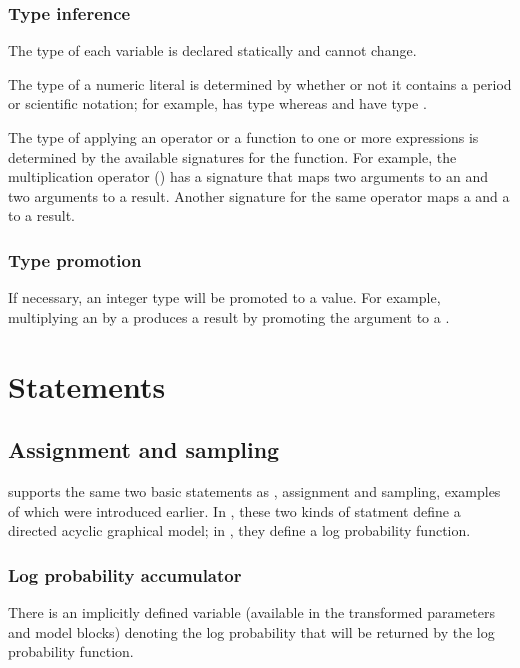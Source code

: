 \documentclass[article]{jss}
\begin{document}
\subsubsection{Type inference}

The type of each variable is declared statically and cannot change.  

The type of a numeric literal is determined by whether or not it
contains a period or scientific notation; for example,  has
type  whereas  and  have type
.

The type of applying an operator or a function to one or more
expressions is determined by the available signatures for the
function.  For example, the multiplication operator (\code{*}) has a
signature that maps two  arguments to an  and two
 arguments to a  result.  Another signature for
the same operator maps a  and a  to a
 result.

\subsubsection{Type promotion}

If necessary, an integer type will be promoted to a  value.
For example, multiplying an  by a  produces a
 result by promoting the  argument to a
.  

\section{Statements}

\subsection{Assignment and sampling}

 supports the same two basic statements as
, assignment and sampling, examples of which were
introduced earlier.  In , these two kinds of statment
define a directed acyclic graphical model; in , they
define a log probability function. 

\subsubsection{Log probability accumulator}

There is an implicitly defined variable  (available in 
the transformed parameters and model blocks) denoting the log
probability that will be returned by the log probability function.  
\end{document}
